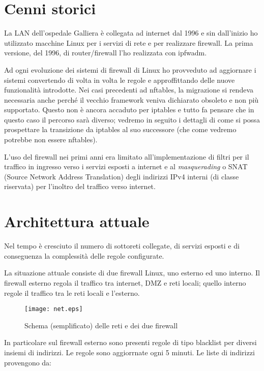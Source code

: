 \section{Cenni storici}

La LAN dell'ospedale Galliera è collegata ad internet dal 1996 e sin
dall'inizio ho utilizzato macchine Linux per i servizi di rete e per
realizzare firewall.  La prima versione, del 1996, di router/firewall l'ho
realizzata con ipfwadm.

Ad ogni evoluzione dei sistemi di firewall di Linux ho provveduto ad
aggiornare i sistemi convertendo di volta in volta le regole e approffittando
delle nuove funzionalità introdotte.  Nei casi precedenti ad nftables, la
migrazione si rendeva necessaria anche perché il vecchio framework veniva
dichiarato obsoleto e non più supportato.  Questo non è ancora accaduto per
iptables e tutto fa pensare che in questo caso il percorso sarà diverso;
vedremo in seguito i dettagli di come si possa prospettare la transizione da
iptables al suo successore (che come vedremo potrebbe non essere nftables).

L'uso del firewall nei primi anni era limitato all'implementazione di filtri
per il traffico in ingresso verso i servizi esposti a internet e al {\em
masquerading} o SNAT (Source Network Address Translation) degli indirizzi IPv4
interni (di classe riservata) per l'inoltro del traffico verso internet.

\section{Architettura attuale}
Nel tempo è cresciuto il numero di sottoreti collegate, di servizi esposti e
di conseguenza la complessità delle regole configurate.

La situazione attuale consiste di due firewall Linux, uno esterno ed uno
interno.  Il firewall esterno regola il traffico tra internet, DMZ e reti
locali; quello interno regole il traffico tra le reti locali e l'esterno.

\begin{figure}
\begin{center}
    \texttt{[image: net.eps]}
    \caption{Schema (semplificato) delle reti e dei due firewall}
    \label{fig:rete}
\end{center}
\end{figure}
In particolare sul firewall esterno sono presenti regole di tipo blacklist per
diversi insiemi di indirizzi. Le regole sono aggiorrnate
ogni 5 minuti.  Le liste di indirizzi provengono da:


